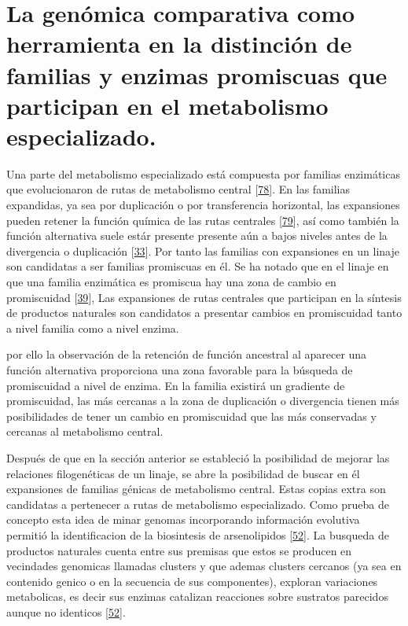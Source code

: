 \documentclass[12pt,twoside]{reedthesis}
\begin{document}
  \section{La genómica comparativa como herramienta en la distinción de
  familias y enzimas promiscuas que participan en el metabolismo
  especializado.}\label{la-genomica-comparativa-como-herramienta-en-la-distincion-de-familias-y-enzimas-promiscuas-que-participan-en-el-metabolismo-especializado.}
  
  Una parte del metabolismo especializado está compuesta por familias
  enzimáticas que evolucionaron de rutas de metabolismo central
  {[}\protect\hyperlink{ref-caetano-anolles_origin_metabolism_2009}{78}{]}.
  En las familias expandidas, ya sea por duplicación o por transferencia
  horizontal, las expansiones pueden retener la función química de las
  rutas centrales
  {[}\protect\hyperlink{ref-schniete_expanding_2018}{79}{]}, así como
  también la función alternativa suele estár presente presente aún a bajos
  niveles antes de la divergencia o duplicación
  {[}\protect\hyperlink{ref-soskine_mutational_2010}{33}{]}. Por tanto las
  familias con expansiones en un linaje son candidatas a ser familias
  promiscuas en él. Se ha notado que en el linaje en que una familia
  enzimática es promiscua hay una zona de cambio en promiscuidad
  {[}\protect\hyperlink{ref-noda-garcia_insights_2015}{39}{]}, Las
  expansiones de rutas centrales que participan en la síntesis de
  productos naturales son candidatos a presentar cambios en promiscuidad
  tanto a nivel familia como a nivel enzima.
  
  por ello la observación de la retención de función ancestral al aparecer
  una función alternativa proporciona una zona favorable para la búsqueda
  de promiscuidad a nivel de enzima. En la familia existirá un gradiente
  de promiscuidad, las más cercanas a la zona de duplicación o divergencia
  tienen más posibilidades de tener un cambio en promiscuidad que las más
  conservadas y cercanas al metabolismo central.
  
  Después de que en la sección anterior se estableció la posibilidad de
  mejorar las relaciones filogenéticas de un linaje, se abre la
  posibilidad de buscar en él expansiones de familias génicas de
  metabolismo central. Estas copias extra son candidatas a pertenecer a
  rutas de metabolismo especializado. Como prueba de concepto esta idea de
  minar genomas incorporando información evolutiva permitió la
  identificacion de la biosintesis de arsenolipidos
  {[}\protect\hyperlink{ref-cruz-morales_phylogenomic_2016}{52}{]}. La
  busqueda de productos naturales cuenta entre sus premisas que estos se
  producen en vecindades genomicas llamadas clusters y que ademas clusters
  cercanos (ya sea en contenido genico o en la secuencia de sus
  componentes), exploran variaciones metabolicas, es decir sus enzimas
  catalizan reacciones sobre sustratos parecidos aunque no identicos
  {[}\protect\hyperlink{ref-cruz-morales_phylogenomic_2016}{52}{]}.
  
\end{document}
